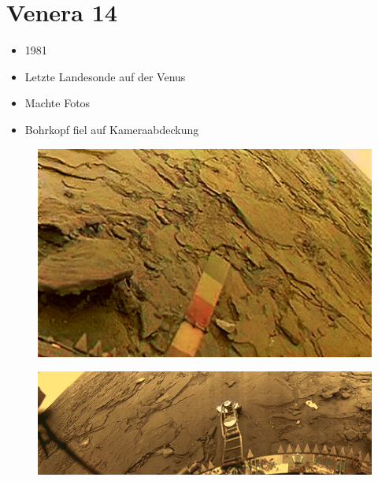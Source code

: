 \documentclass{beamer}
\begin{document}
	\section{Venera 14}
	\begin{frame}
		\begin{itemize}
			\item 1981
			\item Letzte Landesonde auf der Venus
			\item Machte Fotos
			\item Bohrkopf fiel auf Kameraabdeckung
		\end{itemize}
	\end{frame}
	\begin{frame}
		\begin{figure}
			\includegraphics[scale=0.45]{./images/venera_14-1}
		\end{figure}
	\end{frame}
	\begin{frame}
		\begin{figure}
			\includegraphics[scale=1.5]{./images/venera_14-2}
		\end{figure}
	\end{frame}
\end{document}
